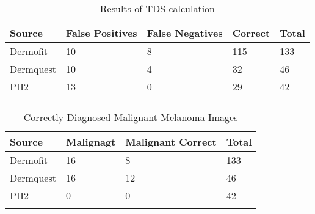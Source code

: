 \begin{longtable}{ | l | l | l | l | l |}
\hline
Source & False Positives & False Negatives & Correct & Total \\ \hline
Dermofit & 10 & 8 & 115 & 133 \\
Dermquest & 10 & 4 & 32 & 46 \\
PH2 & 13 & 0 & 29 & 42 \\
\hline
\caption{Results of TDS calculation}
\label{fig:tda_overview}
\end{longtable}
\begin{longtable}{ | l | l | l | l | }
\hline
Source & Malignagt & Malignant Correct & Total \\ \hline
Dermofit & 16 & 8 & 133 \\
Dermquest & 16 & 12 & 46 \\
PH2 & 0 & 0 & 42 \\
\hline
\caption{Correctly Diagnosed Malignant Melanoma Images}
\label{fig:tds_correct_mal}
\end{longtable}
